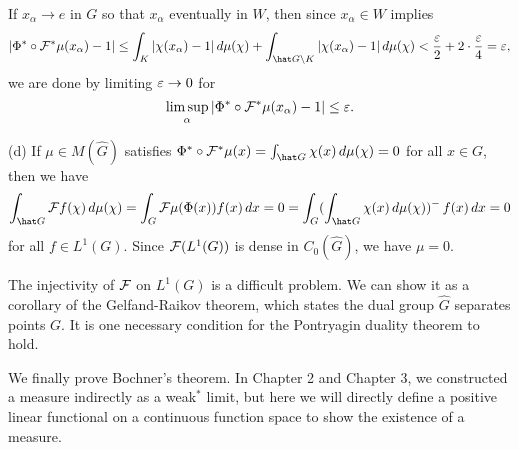 \documentclass[a4paper]{article}
\begin{document}
\begin{pf}
If $x_\alpha\to e$ in $G$ so that $x_\alpha$ eventually in $W$, then since $x_\alpha\in W$ implies
\[|\Phi^*\circ\cF^*\mu(x_\alpha)-1|\le\int_K|\chi(x_\alpha)-1|\,d\mu(\chi)+\int_{\hat G\setminus K}|\chi(x_\alpha)-1|\,d\mu(\chi)<\frac\e2+2\cdot\frac\e4=\e,\]
we are done by limiting $\varepsilon\to0$ for
\[\limsup_\alpha|\Phi^*\circ\mathcal{F}^*\mu(x_\alpha)-1|\le\varepsilon.\]

(d)
If $\mu\in M(\hat G)$ satisfies $\Phi^*\circ\cF^*\mu(x)=\int_{\hat G}\chi(x)\,d\mu(\chi)=0$ for all $x\in G$, then we have
\[\int_{\hat G}\cF f(\chi)\,d\mu(\chi)=\int_G\cF\mu(\Phi(x))f(x)\,dx=0=\int_G(\int_{\hat G}\chi(x)\,d\mu(\chi))^-\,f(x)\,dx=0\]
for all $f\in L^1(G)$.
Since $\mathcal{F}(L^1(G))$ is dense in $C_0(\hat G)$, we have $\mu=0$.
\end{pf}

\begin{rmk}
The injectivity of $\mathcal{F}$ on $L^1(G)$ is a difficult problem.
We can show it as a corollary of the Gelfand-Raikov theorem, which states the dual group $\hat G$ separates points $G$.
It is one necessary condition for the Pontryagin duality theorem to hold.
\end{rmk}

We finally prove Bochner's theorem.
In Chapter 2 and Chapter 3, we constructed a measure indirectly as a weak$^*$ limit, but here we will directly define a positive linear functional on a continuous function space to show the existence of a measure.
\end{document}
